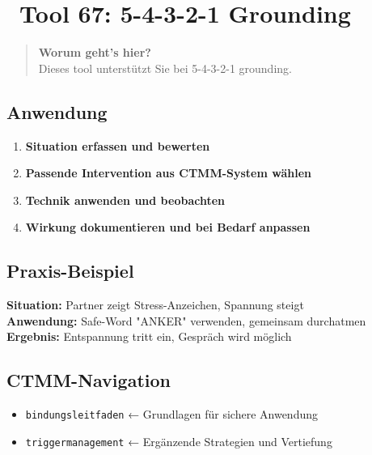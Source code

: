 
\section*{\textcolor{ctmmOrange}{\faCog~Tool 67: 5-4-3-2-1 Grounding}}

\begin{quote}
\textbf{\textcolor{ctmmOrange}{Worum geht's hier?}}\\
Dieses tool unterstützt Sie bei 5-4-3-2-1 grounding.
\end{quote}

\subsection*{\textcolor{ctmmOrange}{Anwendung}}

\begin{ctmmOrangeBox}[title=Schritt-für-Schritt Anleitung]
\begin{enumerate}
  \item \textbf{Situation erfassen und bewerten}
  \item \textbf{Passende Intervention aus CTMM-System wählen}
  \item \textbf{Technik anwenden und beobachten}
  \item \textbf{Wirkung dokumentieren und bei Bedarf anpassen}
\end{enumerate}
\end{ctmmOrangeBox}

\subsection*{\textcolor{ctmmPurple}{Praxis-Beispiel}}
\begin{ctmmBlueBox}[title=So könnte es aussehen]
\textbf{Situation:} Partner zeigt Stress-Anzeichen, Spannung steigt\\
\textbf{Anwendung:} Safe-Word "ANKER" verwenden, gemeinsam durchatmen\\
\textbf{Ergebnis:} Entspannung tritt ein, Gespräch wird möglich
\end{ctmmBlueBox}

\subsection*{\textcolor{ctmmBlue}{CTMM-Navigation}}
\begin{itemize}
  \item \texttt{bindungsleitfaden} ← Grundlagen für sichere Anwendung
  \item \texttt{triggermanagement} ← Ergänzende Strategien und Vertiefung
\end{itemize}